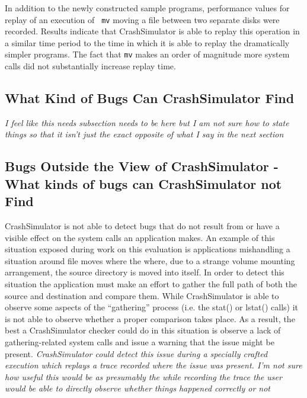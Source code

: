         In addition to the newly constructed sample programs, performance values for replay of an execution of {\tt
          mv} moving a file between two separate disks were recorded.  Results indicate that CrashSimulator is able to
        replay this operation in a similar time period to the time in which it is able to replay the dramatically
        simpler programs.  The fact that {\tt mv} makes an order of magnitude more system calls did not substantially
        increase replay time.

    \subsection{What Kind of Bugs Can CrashSimulator Find}

    \emph{I feel like this needs subsection needs to be here but I am not sure how to state things so that it isn't just
      the exact opposite of what I say in the next section}

    \subsection{Bugs Outside the View of CrashSimulator - What kinds of bugs can CrashSimulator not Find}

    CrashSimulator is not able to detect bugs that do not result from or have a visible effect on the system calls
    an application makes.  An example of this situation exposed during work on this evaluation is applications
    mishandling a situation around file moves where the where, due to a strange volume mounting arrangement, the
    source directory is moved into itself.  In order to detect this situation the application must make an effort to
    gather the full path of both the source and destination and compare them.  While CrashSimulator is able to
    observe some aspects of the ``gathering'' process (i.e. the stat() or lstat() calls) it is not able to observe
    whether a proper comparison takes place.  As a result, the best a CrashSimulator checker could do in this
    situation is observe a lack of gathering-related system calls and issue a warning that the issue might be
    present.  \emph{CrashSimulator could detect this issue during a specially crafted execution which replays a
        trace recorded where the issue was present.  I'm not sure how useful this would be as presumably the while
        recording the trace the user would be able to directly observe whether things happened correctly or not}
        
